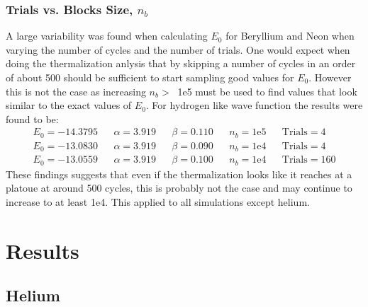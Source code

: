 \documentclass[twocolumn,fleqn,8pt]{article}  %
\begin{document}
\subsubsection{Trials vs. Blocks Size, $n_b$}
A large variability was found when calculating $E_0$ for Beryllium and Neon when 
varying the number of cycles and the number of trials. One would expect
when doing the thermalization anlysis that by skipping a number of cycles in
an order of about 500 should be sufficient to start sampling good values for $E_0$. 
However this is not the case as increasing $n_b > \:$ 1e5 must be used to find
values that look similar to the exact values of $E_0$. 
For hydrogen like wave function the results were found to be:
\begin{align*}
	E_0 = -14.3795 && \alpha = 3.919 && \beta = 0.110 && n_b = \text{1e5}&&\text{Trials} = 4\\
	E_0 = -13.0830 && \alpha = 3.919 && \beta = 0.090 && n_b = \text{1e4}&&\text{Trials} = 4\\
	E_0 = -13.0559 && \alpha = 3.919 && \beta = 0.100 && n_b = \text{1e4}&&\text{Trials} = 160
\end{align*}
These findings suggests that even if the thermalization looks like it
reaches at a platoue at around 500 cycles, this is probably not the case and may continue
to increase to at least 1e4. This applied to all simulations except helium. 


\clearpage

\section{Results}
\subsection{Helium}
\end{document}
